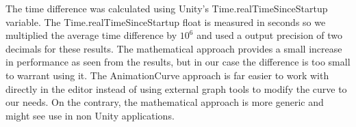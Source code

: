 The time difference was calculated using Unity's Time.realTimeSinceStartup variable. The Time.realTimeSinceStartup float is measured in seconds so we multiplied the average time difference by $10^6$ and used a output precision of two decimals for these results. 
The mathematical approach provides a small increase in performance as seen from the results, but in our case the difference is too small to warrant using it. The AnimationCurve approach is far easier to work with directly in the editor instead of using external graph tools to modify the curve to our needs. On the contrary, the mathematical approach is more generic and might see use in non Unity applications.